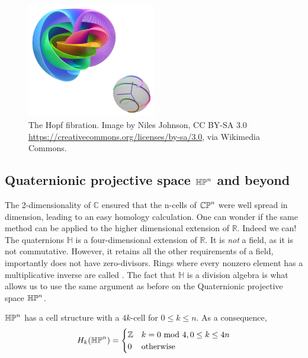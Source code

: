 \begin{figure}[h]
    \centering
    \captionsetup{width=.7\linewidth}
    \includegraphics[width=0.5\textwidth]{hopf-fibration.png}
    \caption{The Hopf fibration. Image by Niles Johnson, CC BY-SA 3.0 \url{https://creativecommons.org/licenses/by-sa/3.0}, via Wikimedia Commons.}
    \label{hopf-fig}
\end{figure}
\subsection{Quaternionic projective space $\mathbb{HP}^{n}$ and beyond}
The 2-dimensionality of $\mathbb{C}$ ensured that the n-cells of $\mathbb{CP}^{n}$ were well spread in dimension, leading to an easy homology calculation. One can wonder if the same method can be applied to the higher dimensional extension of $\mathbb{R}$. Indeed we can! The quaternions $\mathbb{H}$ is a four-dimensional extension of $\mathbb{R}$. It is \textit{not} a field, as it is not commutative. However, it retains all the other requirements of a field, importantly does not have zero-divisors. Rings where every nonzero element has a multiplicative inverse are called . The fact that $\mathbb{H}$ is a division algebra is what allows us to use the same argument as before on the Quaternionic projective space $\mathbb{HP}^{n}$.

\begin{prop}
$\mathbb{HP}^{n}$ has a cell structure with a $4k$-cell for $0\leq k\leq n$. As a consequence, $$H_k(\mathbb{HP}^{n})=\begin{cases}\mathbb{Z} & k=0\text{ mod } 4 , 0\leq k\leq 4n \\ 0 & \text{otherwise}\end{cases}$$
\end{prop}

